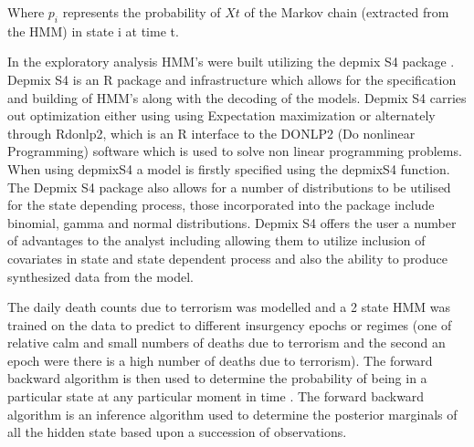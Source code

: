 Where $p_i$ represents the probability of $Xt$ of the Markov chain (extracted from the HMM) in state i at time t.

In the exploratory analysis HMM's were built utilizing the depmix S4 package \citep{visser2012package}. Depmix S4  is an R package and infrastructure which allows for the specification and building of HMM's along with the decoding of the models. Depmix S4 carries out  optimization either using using Expectation maximization or alternately through Rdonlp2, which is an R interface to the DONLP2 (Do nonlinear Programming) \citep{spelluccidonlp} software which is used to solve non linear programming problems. When using depmixS4 a model is firstly specified using the depmixS4 function. The Depmix S4 package also allows for a number of distributions to be utilised for the state depending process, those incorporated into the package include binomial, gamma and normal distributions. Depmix S4 offers the user a number of advantages to the analyst including allowing them to utilize inclusion of covariates in state and state dependent process and also the ability to produce synthesized data from the model.

The daily death counts due to terrorism was modelled and a 2 state HMM was trained on the data to predict to different insurgency epochs or regimes (one of relative calm and small numbers of deaths due to terrorism and the second an epoch were there is a high number of deaths due to terrorism). The forward backward algorithm is then used to determine the probability of being in a particular state at any particular moment in time \citep{austin1991forward}. The forward backward algorithm  is an inference algorithm used to determine the posterior marginals of all the hidden state based upon a succession of observations. 

